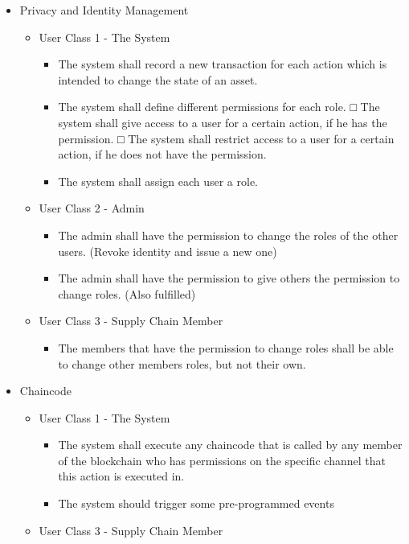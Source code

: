 \begin{itemize}
    \item Privacy and Identity Management
    \begin{itemize}
        \item User Class 1 - The System
        \begin{itemize}
			\item The system shall record a new transaction for each action which is intended to change the state of an asset.
			\item The system shall define different permissions for each role.
				□ The system shall give access to a user for a certain action, if he has the permission.
				□ The system shall restrict access to a user for a certain action, if he does not have the permission.
			\item The system shall assign each user a role.
		\end{itemize}
        \item User Class 2 - Admin
    \begin{itemize}
			\item The admin shall have the permission to change the roles of the other users.
				(Revoke identity and issue a new one)
			\item The admin shall have the permission to give others the permission to change roles.
				 (Also fulfilled)
		\end{itemize}
        \item User Class 3 - Supply Chain Member
        \begin{itemize}
            \item The members that have the permission to change roles shall be able to change other members roles, but not their own.
        \end{itemize}
    \end{itemize}
	\item Chaincode
    \begin{itemize}
        \item User Class 1 - The System
            \begin{itemize}
			\item The system shall execute any chaincode that is called by any member of the blockchain who has permissions on the specific channel that this action is executed in.
            \item The system should trigger some pre-programmed events
            \end{itemize}
        \item User Class 3 - Supply Chain Member

\end{itemize}
\end{itemize}
